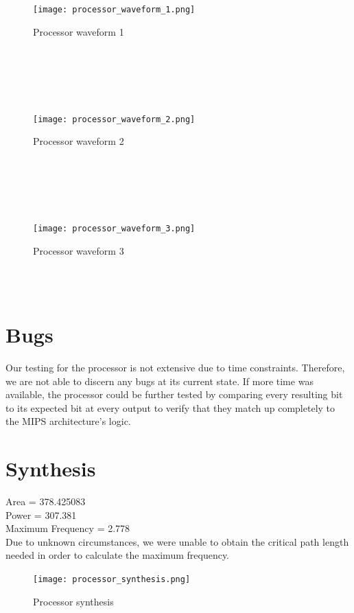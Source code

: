 \documentclass{article}
\begin{document}
\\ \\
\begin{figure}[!ht]
	\centering
		\texttt{[image: processor\_waveform\_1.png]}
		\caption{Processor waveform 1}
\end{figure}
\\ \\

\\ \\
\begin{figure}[!ht]
	\centering
		\texttt{[image: processor\_waveform\_2.png]}
		\caption{Processor waveform 2}
\end{figure}
\\ \\

\\ \\
\begin{figure}[!ht]
	\centering
		\texttt{[image: processor\_waveform\_3.png]}
		\caption{Processor waveform 3}
\end{figure}
\\ \\
 
\section{Bugs}
Our testing for the processor is not extensive due to time constraints. Therefore, we are not able to discern any bugs at its current state. If more time was available, the processor could be further tested by comparing every resulting bit to its expected bit at every output to verify that they match up completely to the MIPS architecture's logic.

\section{Synthesis}
Area = 378.425083\\
Power = 307.381\\
Maximum Frequency = 2.778\\

Due to unknown circumstances, we were unable to obtain the critical path length needed in order to calculate the maximum frequency.

\begin{figure}[!ht]
	\centering
		\texttt{[image: processor\_synthesis.png]}
		\caption{Processor synthesis}
\end{figure}
\\ \\
\end{document}
